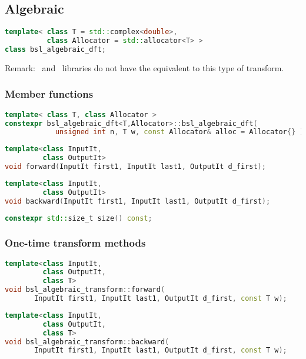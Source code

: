 \subsection{Algebraic \dft}

\begin{lstlisting}[language=C++]
template< class T = std::complex<double>, 
          class Allocator = std::allocator<T> >
class bsl_algebraic_dft;
\end{lstlisting}

Remark: \gsl\ and \fftw\ libraries do not have the equivalent to this type of
transform.

\subsubsection{Member functions}

\begin{lstlisting}[language=C++]
template< class T, class Allocator >
constexpr bsl_algebraic_dft<T,Allocator>::bsl_algebraic_dft(
            unsigned int n, T w, const Allocator& alloc = Allocator{} );
\end{lstlisting}
\begin{lstlisting}[language=C++]
template<class InputIt,
         class OutputIt>
void forward(InputIt first1, InputIt last1, OutputIt d_first);
\end{lstlisting}
\begin{lstlisting}[language=C++]
template<class InputIt,
         class OutputIt>
void backward(InputIt first1, InputIt last1, OutputIt d_first);
\end{lstlisting}
\begin{lstlisting}[language=C++]
constexpr std::size_t size() const;
\end{lstlisting}


\subsubsection{One-time transform methods}

\begin{lstlisting}[language=C++]
template<class InputIt,
         class OutputIt,
         class T>
void bsl_algebraic_transform::forward(
       InputIt first1, InputIt last1, OutputIt d_first, const T w);
\end{lstlisting}
\begin{lstlisting}[language=C++]
template<class InputIt,
         class OutputIt,
         class T>
void bsl_algebraic_transform::backward(
       InputIt first1, InputIt last1, OutputIt d_first, const T w);
\end{lstlisting}

